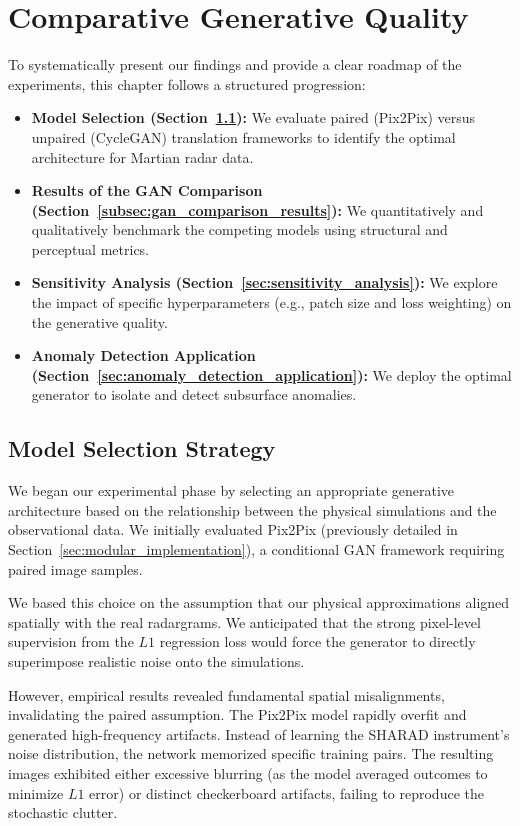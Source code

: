 \section{Comparative Generative Quality}
\label{sec:comparative_generative_quality}

To systematically present our findings and provide a clear roadmap of the experiments, this chapter follows a structured progression:
\begin{itemize}
    \item \textbf{Model Selection (Section~\ref{subsec:model_selection}):} We evaluate paired (Pix2Pix) versus unpaired (CycleGAN) translation frameworks to identify the optimal architecture for Martian radar data.
    \item \textbf{Results of the GAN Comparison (Section~\ref{subsec:gan_comparison_results}):} We quantitatively and qualitatively benchmark the competing models using structural and perceptual metrics.
    \item \textbf{Sensitivity Analysis (Section~\ref{sec:sensitivity_analysis}):} We explore the impact of specific hyperparameters (e.g., patch size and loss weighting) on the generative quality.
    \item \textbf{Anomaly Detection Application (Section~\ref{sec:anomaly_detection_application}):} We deploy the optimal generator to isolate and detect subsurface anomalies.
\end{itemize}

\subsection{Model Selection Strategy}
\label{subsec:model_selection}

We began our experimental phase by selecting an appropriate generative architecture based on the relationship between the physical simulations and the observational data.
We initially evaluated Pix2Pix (previously detailed in Section~\ref{sec:modular_implementation}), a conditional GAN framework requiring paired image samples. 

We based this choice on the assumption that our physical approximations aligned spatially with the real radargrams.
We anticipated that the strong pixel-level supervision from the $L1$ regression loss would force the generator to directly superimpose realistic noise onto the simulations. 

However, empirical results revealed fundamental spatial misalignments, invalidating the paired assumption.
The Pix2Pix model rapidly overfit and generated high-frequency artifacts.
Instead of learning the SHARAD instrument's noise distribution, the network memorized specific training pairs.
The resulting images exhibited either excessive blurring (as the model averaged outcomes to minimize $L1$ error) or distinct checkerboard artifacts, failing to reproduce the stochastic clutter.

